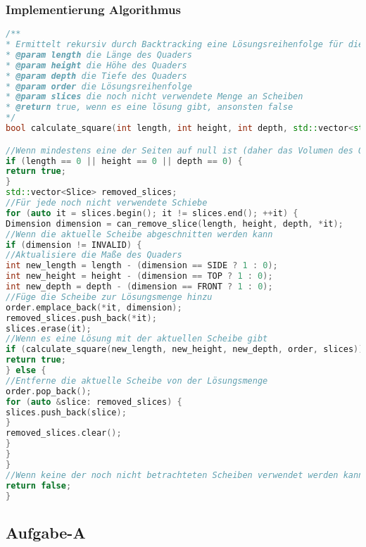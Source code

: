 \documentclass[a4paper,10pt,ngerman]{scrartcl}
\begin{document}
    \subsubsection{Implementierung Algorithmus}
    \begin{lstlisting}[frame=single,language=C++,title=Methode calculate\_square,breaklines=true,label={lst:code_calculateSquare}]
/**
* Ermittelt rekursiv durch Backtracking eine Lösungsreihenfolge für die gegebene Menge an Scheiben.
* @param length die Länge des Quaders
* @param height die Höhe des Quaders
* @param depth die Tiefe des Quaders
* @param order die Lösungsreihenfolge
* @param slices die noch nicht verwendete Menge an Scheiben
* @return true, wenn es eine lösung gibt, ansonsten false
*/
bool calculate_square(int length, int height, int depth, std::vector<std::pair<Slice, Dimension>> &order, std::vector<Slice> &slices) {

//Wenn mindestens eine der Seiten auf null ist (daher das Volumen des Quaders null ist)
if (length == 0 || height == 0 || depth == 0) {
return true;
}
std::vector<Slice> removed_slices;
//Für jede noch nicht verwendete Schiebe
for (auto it = slices.begin(); it != slices.end(); ++it) {
Dimension dimension = can_remove_slice(length, height, depth, *it);
//Wenn die aktuelle Scheibe abgeschnitten werden kann
if (dimension != INVALID) {
//Aktualisiere die Maße des Quaders
int new_length = length - (dimension == SIDE ? 1 : 0);
int new_height = height - (dimension == TOP ? 1 : 0);
int new_depth = depth - (dimension == FRONT ? 1 : 0);
//Füge die Scheibe zur Lösungsmenge hinzu
order.emplace_back(*it, dimension);
removed_slices.push_back(*it);
slices.erase(it);
//Wenn es eine Lösung mit der aktuellen Scheibe gibt
if (calculate_square(new_length, new_height, new_depth, order, slices)) {
return true;
} else {
//Entferne die aktuelle Scheibe von der Lösungsmenge
order.pop_back();
for (auto &slice: removed_slices) {
slices.push_back(slice);
}
removed_slices.clear();
}
}
}
//Wenn keine der noch nicht betrachteten Scheiben verwendet werden kann
return false;
}
    \end{lstlisting}

    \newpage

    \subsection{Aufgabe-A}\label{subsec:alles-kaese}
\end{document}
